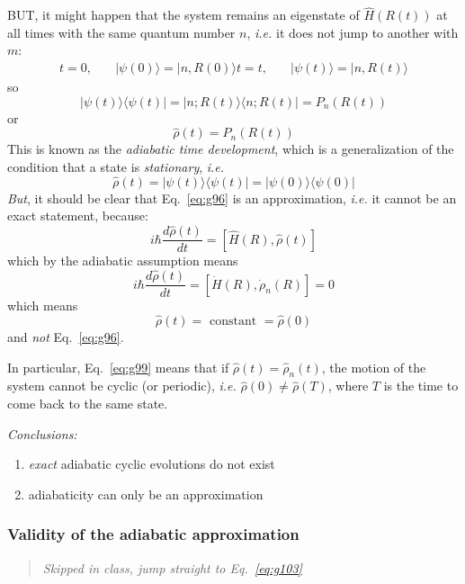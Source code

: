 \documentclass[12pt]{article}
\newcommand{\be}{\begin{equation}}
\newcommand{\ee}{\end{equation}}
\begin{document}
BUT, it might happen that the system
remains an eigenstate of $\hat{H}(R(t))$ at all
times with the same quantum number $n$,
\textit{i.e.} it does not jump to another with $m$:
\be
\begin{aligned}
t=0, \quad&|\psi(0)\rangle=|n, R(0)\rangle
t=t, \quad&|\psi(t)\rangle=|n, R(t)\rangle
\end{aligned}
\ee
so
\be
|\psi(t)\rangle\langle\psi(t)|=| n ; R(t)\rangle\langle n ; R(t)|=P_{n}(R(t))
\label{eq:g96}
\ee
or
\be
\hat{\rho}(t)=P_{n}(R(t))
\ee
This is known as the \emph{adiabatic time development},
which is a generalization of the condition that
a state is \emph{stationary}, \textit{i.e.}
\be
\hat{\rho}(t)=|\psi(t)\rangle\langle\psi(t)|=| \psi(0)\rangle\langle\psi(0)|
\ee
\emph{But}, it should be clear that Eq.~\eqref{eq:g96} is an
approximation, \textit{i.e.} it cannot be an exact
statement, because:
\[
i \hbar \frac{d \hat{\rho}(t)}{d t}=[\hat{H}(R), \hat{\rho}(t)]
\]
which by the adiabatic assumption means
\be
i \hbar \frac{d \hat{\rho}(t)}{d t}=\left[\dot{H}(R), \dot{\rho}_{n}(R)\right]=0
\label{eq:g99}
\ee
which means
\be
\hat{\rho}(t) = \text{ constant } = \hat{\rho}(0)
\ee
and \emph{not} Eq.~\eqref{eq:g96}.

In particular, Eq.~\eqref{eq:g99} means that if
$\hat{\rho}(t)=\hat{\rho}_{n}(t)$, the motion of the system cannot
be cyclic (or periodic), \textit{i.e.} $\hat{\rho}(0) \neq \hat{\rho}(T)$, where
$T$ is the time to come back to the same state.

\emph{Conclusions:}
\begin{enumerate}
\item \emph{exact} adiabatic cyclic evolutions do not exist
\item adiabaticity can only be an approximation
\end{enumerate}

\setcounter{subsubsection}{2}
\subsubsection{Validity of the adiabatic approximation}

\begin{quote}\emph{Skipped in class, jump straight to Eq.~\eqref{eq:g103}}\end{quote}
\end{document}
